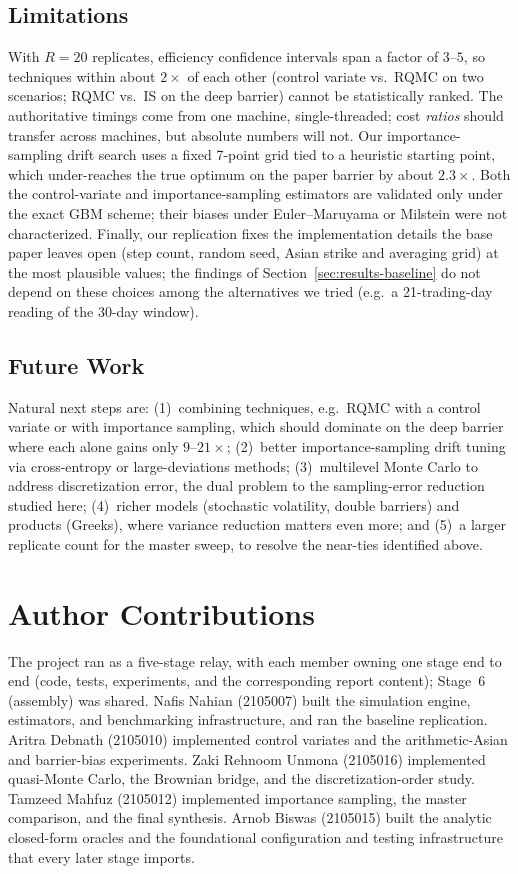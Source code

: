 \documentclass[sigconf]{acmart}
\begin{document}
\subsection{Limitations}
With $R=20$ replicates, efficiency confidence intervals span a factor of
$3$--$5$, so techniques within about $2\times$ of each other (control
variate vs.\ RQMC on two scenarios; RQMC vs.\ IS on the deep barrier) cannot
be statistically ranked. The authoritative timings come from one machine,
single-threaded; cost \emph{ratios} should transfer across machines, but
absolute numbers will not. Our importance-sampling drift search uses a fixed
7-point grid tied to a heuristic starting point, which under-reaches the true
optimum on the paper barrier by about $2.3\times$. Both the control-variate
and importance-sampling estimators are validated only under the exact GBM
scheme; their biases under Euler--Maruyama or Milstein were not
characterized. Finally, our replication fixes the implementation details
the base paper leaves open (step count, random seed, Asian strike and
averaging grid) at the most plausible values; the findings of
Section~\ref{sec:results-baseline} do not depend on these choices among
the alternatives we tried (e.g.\ a 21-trading-day reading of the 30-day
window).

\subsection{Future Work}
Natural next steps are: (1)~combining techniques, e.g.\ RQMC with a control
variate or with importance sampling, which should dominate on the deep
barrier where each alone gains only $9$--$21\times$; (2)~better
importance-sampling drift tuning via cross-entropy or large-deviations
methods; (3)~multilevel Monte Carlo to address discretization error, the
dual problem to the sampling-error reduction studied here; (4)~richer
models (stochastic volatility, double barriers) and products (Greeks), where
variance reduction matters even more; and (5)~a larger replicate count for
the master sweep, to resolve the near-ties identified above.

\section*{Author Contributions}
The project ran as a five-stage relay, with each member owning one stage end
to end (code, tests, experiments, and the corresponding report content);
Stage~6 (assembly) was shared. Nafis Nahian (2105007) built the simulation
engine, estimators, and benchmarking infrastructure, and ran the baseline
replication. Aritra Debnath (2105010) implemented control variates and the
arithmetic-Asian and barrier-bias experiments. Zaki Rehnoom Unmona (2105016)
implemented quasi-Monte Carlo, the Brownian bridge, and the discretization-order
study. Tamzeed Mahfuz (2105012) implemented importance sampling, the master
comparison, and the final synthesis. Arnob Biswas (2105015) built the
analytic closed-form oracles and the foundational configuration and testing
infrastructure that every later stage imports.
\end{document}
